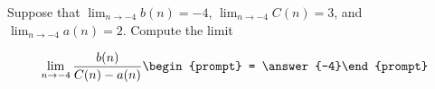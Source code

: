 \documentclass{ximera}
\author{Matthew Carr}
\begin{document}
\begin{exercise}
Suppose that $\lim_{n\to-4}b(n)=-4$, $\lim_{n\to-4}C(n)=3$, and $\lim_{n\to-4}a(n)=2$. Compute the limit

\[
\lim_{n\to -4 } \frac{b(n)}{C(n)-a(n)}\begin{prompt} = \answer{-4}\end{prompt}
\]
\end{exercise}
\end{document}
